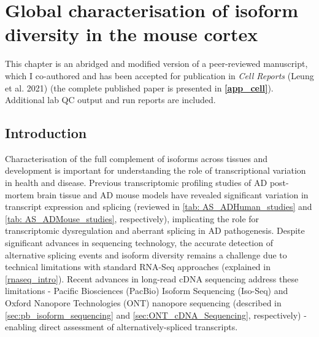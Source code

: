 \cleardoublepage
\chapter{Global characterisation of isoform diversity in the mouse cortex}
\label{ch: whole_transcriptome}


This chapter is an abridged and modified version of a peer-reviewed manuscript, which I co-authored and has been accepted for publication in \textit{Cell Reports} (Leung et al. 2021)\cite{Leung2021} (the complete published paper is presented in \textbf{\cref{app_cell}}). Additional lab QC output and run reports are included. 

\section{Introduction}
Characterisation of the full complement of isoforms across tissues and development is important for understanding the role of transcriptional variation in health and disease. Previous transcriptomic profiling studies of AD post-mortem brain tissue and AD mouse models have revealed significant variation in transcript expression and splicing (reviewed in \cref{tab: AS_ADHuman_studies} and \cref{tab: AS_ADMouse_studies}, respectively), implicating the role for transcriptomic dysregulation and aberrant splicing in AD pathogenesis\cite{Raj2018}. Despite significant advances in sequencing technology, the accurate detection of alternative splicing events and isoform diversity remains a challenge due to technical limitations with standard RNA-Seq approaches (explained in \cref{rnaseq_intro}). Recent advances in long-read cDNA sequencing address these limitations - Pacific Biosciences (PacBio) Isoform Sequencing (Iso-Seq) and Oxford Nanopore Technologies (ONT) nanopore sequencing (described in \cref{sec:pb_isoform_sequencing} and \cref{sec:ONT_cDNA_Sequencing}, respectively) - enabling direct assessment of alternatively-spliced transcripts\cite{Amarasinghe2020}.

